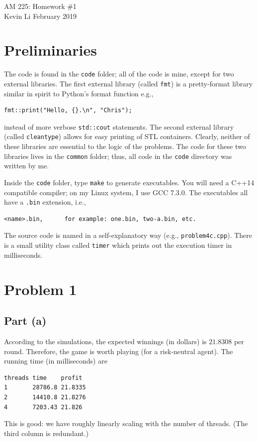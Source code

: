 \documentclass{article}
\theoremstyle{definition}
\begin{document}
{\selectfont
  \begin{center}
    {\Large AM 225: Homework \#1}\\
Kevin Li  February 2019 \\
  \end{center}
}

\section*{Preliminaries}
The code is found in the \texttt{code} folder; all of the code is mine,
except for two external libraries. The first external library (called \texttt{fmt})
is a pretty-format library similar in spirit to Python's format function e.g.,
\begin{verbatim}fmt::print("Hello, {}.\n", "Chris");
\end{verbatim}
instead of more verbose \texttt{std::cout} statements.
The second external library (called \texttt{cleantype})
allows for easy printing of STL containers. Clearly, neither of these
libraries are essential to the logic of the problems.
The code for these two libraries lives in the \texttt{common} folder;
thus, all code in the \texttt{code} directory was written by me.

Inside the \texttt{code} folder, type \texttt{make} to
generate executables. You will need a C++14 compatible compiler;
on my Linux system, I use GCC 7.3.0. The executables
all have a \texttt{.bin} extension, i.e.,
\begin{verbatim}
<name>.bin,      for example: one.bin, two-a.bin, etc.
\end{verbatim}
The source code is named in a self-explanatory way (e.g., \texttt{problem4c.cpp}).
There is a small utility class called \texttt{timer} which prints out
the execution timer in milliseconds.


\section{Problem 1}
\subsection{Part (a)}
According to the simulations, the expected winnings (in dollars)
is $21.8308$ per round. Therefore, the game is worth playing (for a 
risk-neutral agent). The running time (in milliseconds) are
\begin{verbatim}
threads time    profit
1       28786.8 21.8335
2       14410.8 21.8276
4       7203.43 21.826
\end{verbatim}
This is good: we have roughly linearly scaling with the number of threads.
(The third column is redundant.)
\end{document}

